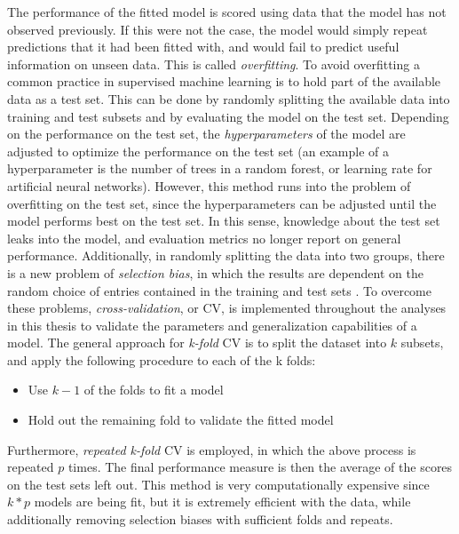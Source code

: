 \documentclass[a4paper, twoside, final, 12pt]{article}
\begin{document}
The performance of the fitted model is scored using data that the model has not observed previously.
If this were not the case, the model would simply repeat predictions that  it had been fitted with, and would fail to predict useful information on  unseen data.
This is called \textit{overfitting}. To avoid overfitting a common practice in supervised machine learning is to hold part of the available data as a test set.
This can be done by randomly splitting the available data into training and test subsets and by evaluating the model on the test set.
Depending on the performance on the test set, the \textit{hyperparameters} of the model are adjusted to optimize the performance on the test set  (an example of a hyperparameter is the number of trees in a random forest, or learning rate for artificial neural networks).
However, this method runs into the problem of overfitting on the test set, since the hyperparameters can be adjusted until the model performs best on the test set.
In this sense, knowledge about the test set leaks into the model, and evaluation metrics no longer report on general performance.
Additionally, in randomly splitting the data into two groups, there is a new problem of \textit{selection bias}, in which the results are dependent on the random choice of entries contained in the training and test sets \cite{Selection_Bias}.
To overcome these problems, \textit{cross-validation}, or CV, is implemented throughout the analyses in this thesis to validate the parameters and generalization capabilities of a model.
The general approach for \textit{k-fold} CV is to split the dataset into $k$ subsets, and apply the following procedure to each of the k folds:
\begin{itemize}
	\item Use $k-1$ of the folds to fit a model 
	\item Hold out the remaining fold to validate the fitted model
\end{itemize}
Furthermore, \textit{repeated k-fold} CV is employed, in which the above process is repeated $p$ times.
The final performance measure is then the average of the scores on the test sets left out.
This method is very computationally expensive since $k*p$ models are being fit, but it is extremely efficient with the data, while additionally removing selection biases with sufficient folds and repeats.
\end{document}
